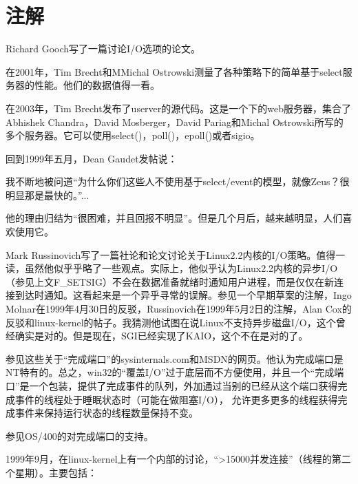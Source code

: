 \documentclass[twoside, xetex]{report}
\begin{document}
\section*{注解}
	Richard Gooch写了一篇讨论I/O选项的论文。
	
	在2001年，Tim Brecht和MMichal Ostrowski测量了各种策略下的简单基于select服务器的性能。他们的数据值得一看。

	在2003年，Tim Brecht发布了userver的源代码。这是一个下的web服务器，集合了Abhishek Chandra，David Mosberger，David Pariag和Michal Ostrowski所写的多个服务器。它可以使用select()，poll()，epoll()或者sigio。

	回到1999年五月，Dean Gaudet发帖说：

	我不断地被问道“为什么你们这些人不使用基于select/event的模型，就像Zeus？很明显那是最快的。”...

	他的理由归结为“很困难，并且回报不明显”。但是几个月后，越来越明显，人们喜欢使用它。

	Mark Russinovich写了一篇社论和论文讨论关于Linux2.2内核的I/O策略。值得一读，虽然他似乎乎略了一些观点。实际上，他似乎认为Linux2.2内核的异步I/O（参见上文F\_SETSIG）不会在数据准备就绪时通知用户进程，而是仅仅在新连接到达时通知。这看起来是一个异乎寻常的误解。参见一个早期草案的注解，Ingo Molnar在1999年4月30日的反驳，Russinovich在1999年5月2日的注解，Alan Cox的反驳和linux-kernel的帖子。我猜测他试图在说Linux不支持异步磁盘I/O，这个曾经确实是对的。但是现在，SGI已经实现了KAIO，这个不在是对的了。

	参见这些关于“完成端口”的sysinternals.com和MSDN的网页。他认为完成端口是NT特有的。总之，win32的“覆盖I/O”过于底层而不方便使用，并且一个“完成端口”是一个包装，提供了完成事件的队列，外加通过当别的已经从这个端口获得完成事件的线程处于睡眠状态时（可能在做阻塞I/O）， 允许更多更多的线程获得完成事件来保持运行状态的线程数量保持不变。
	
	参见OS/400的对完成端口的支持。

	1999年9月，在linux-kernel上有一个内部的讨论，“>15000并发连接”（线程的第二个星期）。主要包括：
\end{document}
